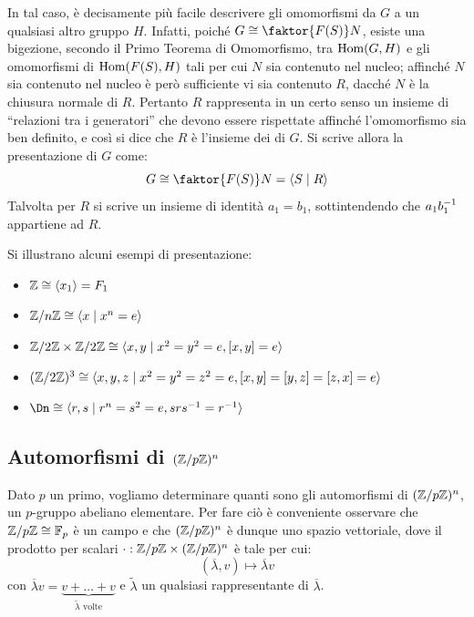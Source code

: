 \documentclass[11pt]{scrartcl}
\begin{document}
	
	In tal caso, è decisamente più facile descrivere gli
	omomorfismi da $G$ a un qualsiasi altro gruppo $H$.
	Infatti, poiché $G \cong \faktor{F(S)}N$, esiste una bigezione,
	secondo il Primo Teorema di Omomorfismo, tra
	$\operatorname{Hom}(G, H)$ e gli omomorfismi di $\operatorname{Hom}(F(S), H)$ tali
	per cui $N$ sia contenuto nel nucleo; affinché $N$
	sia contenuto nel nucleo è però sufficiente
	vi sia contenuto $R$, dacché $N$ è la chiusura normale
	di $R$. Pertanto $R$ rappresenta in un certo senso un
	insieme di ``relazioni tra i generatori'' che devono
	essere rispettate affinché l'omomorfismo sia ben definito, e
	così si dice che $R$ è l'insieme dei  di $G$.
	Si scrive allora la presentazione di $G$ come:
	\[ G \cong \faktor{F(S)}N = \langle S \mid R \rangle \]
	Talvolta per $R$ si scrive un insieme di identità
	$a_1 = b_1$, sottintendendo che
	$a_1 b_1^{-1}$ appartiene ad $R$.
	
	\begin{example}
		Si illustrano alcuni esempi di presentazione:
		
		\begin{itemize}
			\item $\mathbb Z \cong \langle x_1 \rangle = F_1$
			\item $\mathbb{Z}/{n}\mathbb{Z} \cong \langle{x \mid x^n = e}\rangle$
			\item $\mathbb{Z}/{2}\mathbb{Z} \times \mathbb{Z}/{2}\mathbb{Z} \cong \langle{x, y \mid x^2 = y^2 = e, [x, y] = e}\rangle$
			\item $(\mathbb{Z}/{2}\mathbb{Z})^3 \cong \langle x, y, z \mid x^2 = y^2 = z^2 = e, [x, y] = [y, z] = [z, x] = e \rangle$
			\item $\Dn \cong \langle{r, s \mid r^n = s^2 = e, srs\inv = r\inv}\rangle$
		\end{itemize}
	\end{example}
	
	\newpage
	
	\subsection{Automorfismi di \texorpdfstring{$({\mathbb Z}/p{\mathbb Z})^n$}{(ℤ/pℤ)ⁿ}}
	\label{sez1.2}
	
	Dato $p$ un primo, vogliamo determinare quanti sono gli automorfismi di 
	$({\mathbb Z}/p{\mathbb Z})^n$, un $p$-gruppo abeliano elementare. Per fare ciò è conveniente osservare che $\mathbb{Z}/{p}\mathbb{Z} \cong \mathbb F_p$ è un campo e che
	$(\mathbb{Z}/{p}\mathbb{Z})^n$ è dunque uno spazio vettoriale, dove il prodotto per scalari $\cdot : {\mathbb Z}/p{\mathbb Z}\times ({\mathbb Z}/p{\mathbb Z})^n$ è
	tale per cui:
	\[
	(\overline{\lambda}, v)\longmapsto \overline{\lambda}v
	\]
	con $\overline{\lambda}v = \underset{\tilde{\lambda}\text{ volte}}{\underbrace{v + \ldots + v}}$
	e $\tilde{\lambda}$ un qualsiasi rappresentante di $\overline{\lambda}$. \medskip
	
\end{document}
